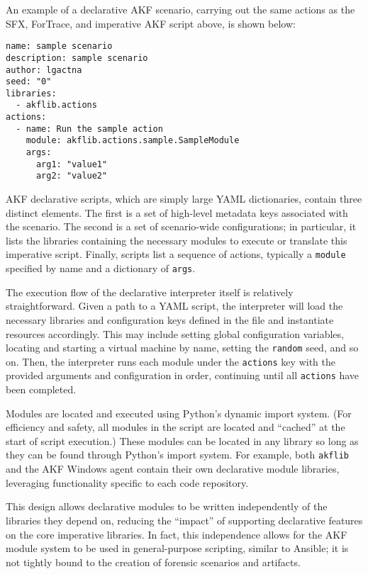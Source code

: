 \documentclass[letterpaper,12pt]{report}
\newcommand{\passthrough}[1]{#1}
\begin{document}
An example of a declarative AKF scenario, carrying out the same actions
as the SFX, ForTrace, and imperative AKF script above, is shown below:

\begin{lstlisting}
name: sample scenario
description: sample scenario
author: lgactna
seed: "0"
libraries:
  - akflib.actions
actions:
  - name: Run the sample action
    module: akflib.actions.sample.SampleModule
    args:
      arg1: "value1"
      arg2: "value2"
\end{lstlisting}

AKF declarative scripts, which are simply large YAML dictionaries,
contain three distinct elements. The first is a set of high-level
metadata keys associated with the scenario. The second is a set of
scenario-wide configurations; in particular, it lists the libraries
containing the necessary modules to execute or translate this imperative
script. Finally, scripts list a sequence of actions, typically a
\passthrough{\lstinline!module!} specified by name and a dictionary of
\passthrough{\lstinline!args!}.

The execution flow of the declarative interpreter itself is relatively
straightforward. Given a path to a YAML script, the interpreter will
load the necessary libraries and configuration keys defined in the file
and instantiate resources accordingly. This may include setting global
configuration variables, locating and starting a virtual machine by
name, setting the \passthrough{\lstinline!random!} seed, and so on.
Then, the interpreter runs each module under the
\passthrough{\lstinline!actions!} key with the provided arguments and
configuration in order, continuing until all
\passthrough{\lstinline!actions!} have been completed.

Modules are located and executed using Python's dynamic import system.
(For efficiency and safety, all modules in the script are located and
``cached'' at the start of script execution.) These modules can be
located in any library so long as they can be found through Python's
import system. For example, both \passthrough{\lstinline!akflib!} and
the AKF Windows agent contain their own declarative module libraries,
leveraging functionality specific to each code repository.

This design allows declarative modules to be written independently of
the libraries they depend on, reducing the ``impact'' of supporting
declarative features on the core imperative libraries. In fact, this
independence allows for the AKF module system to be used in
general-purpose scripting, similar to Ansible; it is not tightly bound
to the creation of forensic scenarios and artifacts.
\end{document}
